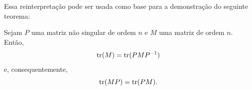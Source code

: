 	Essa reinterpretação pode ser usada como base para a demonstração do seguinte teorema:
	\begin{theorem}
	\label{traco}
		Sejam $P$ uma matriz não singular de ordem $n$ e $M$ uma matriz de ordem $n$. Então, 
		\begin{equation*}
		    \operatorname{tr}(M) = \operatorname{tr}(PMP^{-1})
		\end{equation*}
		e, consequentemente,
		\begin{equation*}
		    \operatorname{tr}(MP) = \operatorname{tr}(PM).
		\end{equation*}
	\end{theorem} 
